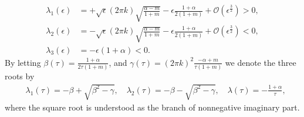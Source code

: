 \documentclass[a4paper,11pt]{article}
\def\k{(2\pi k)}
\newtheorem{proposition}{Proposition}[section]
\theoremstyle{remark}
\begin{document}
\begin{align*}
 \lambda_1(\epsilon) &= +\sqrt{\epsilon} (2\pi k)\sqrt{\frac{\alpha-m}{1+m}} - \epsilon\frac{1+\alpha}{2(1+m)} + \mathcal{O}(\epsilon^{\frac{3}{2}}) > 0,\\
 \lambda_2(\epsilon) &= -\sqrt{\epsilon} (2\pi k)\sqrt{\frac{\alpha-m}{1+m}} - \epsilon\frac{1+\alpha}{2(1+m)} + \mathcal{O}(\epsilon^{\frac{3}{2}}) < 0,\\
 \lambda_3(\epsilon) &= -\epsilon(1+\alpha)<0.
\end{align*}
By letting $\beta(\tau) = \frac{1+\alpha}{2\tau(1+m)}$, and $\gamma(\tau)= \k^2\frac{-\alpha+m}{\tau(1+m)}$ we denote the three roots by
\begin{equation}
\begin{aligned}
 &\lambda_1(\tau) = -\beta + \sqrt{\beta^2-\gamma}, \quad \lambda_2(\tau) = -\beta - \sqrt{\beta^2-\gamma}, \quad \lambda(\tau) = -\frac{1+\alpha}{\tau},
\end{aligned}
\end{equation}
where the square root is understood as the branch of nonnegative imaginary part.

%
%
\end{document}
